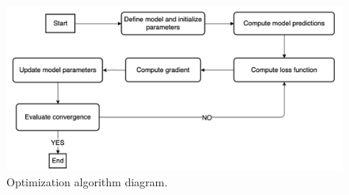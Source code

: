 \begin{figure}
    \centering
    \includegraphics[width=\linewidth, keepaspectratio]{img//chapter4/backpropagation.png}
    \caption[Optimization algorithm diagram]{Optimization algorithm diagram.}
    \label{fig:backpropagation_algorithm}
\end{figure}